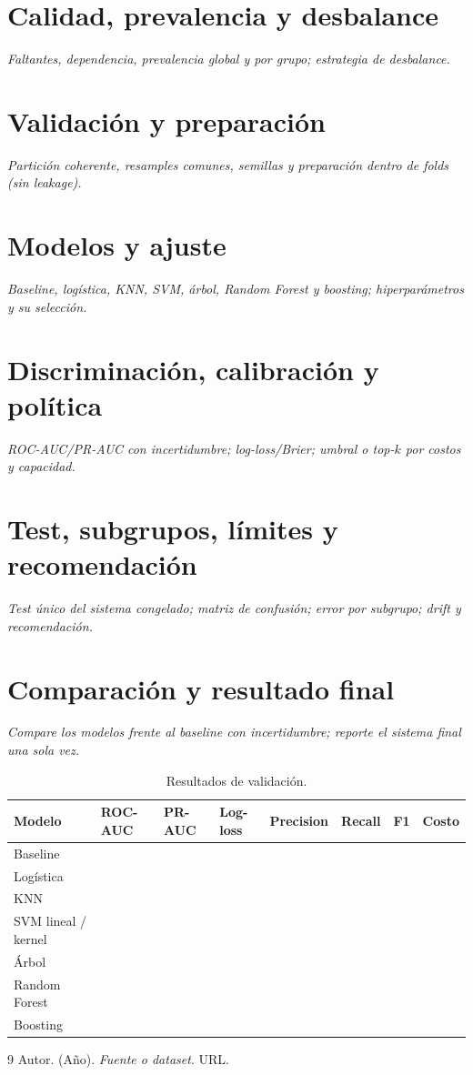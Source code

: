 \documentclass[titlepage,11pt,letterpaper]{article}
\newcommand{\instruccion}[1]{\par\smallskip\noindent\textit{\color{gray!75!black}#1}\par\smallskip}
\begin{document}
\section{Calidad, prevalencia y desbalance}
\instruccion{Faltantes, dependencia, prevalencia global y por grupo; estrategia de desbalance.}

\section{Validación y preparación}
\instruccion{Partición coherente, resamples comunes, semillas y preparación dentro de folds (sin leakage).}

\section{Modelos y ajuste}
\instruccion{Baseline, logística, KNN, SVM, árbol, Random Forest y boosting; hiperparámetros y su selección.}

\section{Discriminación, calibración y política}
\instruccion{ROC-AUC/PR-AUC con incertidumbre; log-loss/Brier; umbral o top-$k$ por costos y capacidad.}

\section{Test, subgrupos, límites y recomendación}
\instruccion{Test único del sistema congelado; matriz de confusión; error por subgrupo; drift y recomendación.}

\section{Comparación y resultado final}
\instruccion{Compare los modelos frente al baseline con incertidumbre; reporte el sistema final una sola vez.}
\begin{table}[H]\centering\small
\caption{Resultados de validación.}
\begin{tabular}{llllllll}
\toprule
Modelo & ROC-AUC & PR-AUC & Log-loss & Precision & Recall & F1 & Costo \\
\midrule
Baseline & & & & & & & \\
Logística & & & & & & & \\
KNN & & & & & & & \\
SVM lineal / kernel & & & & & & & \\
Árbol & & & & & & & \\
Random Forest & & & & & & & \\
Boosting & & & & & & & \\
\bottomrule
\end{tabular}\end{table}
\begin{thebibliography}{9}
 Autor. (Año). \textit{Fuente o dataset}. URL.
\end{thebibliography}
\appendix
\end{document}
